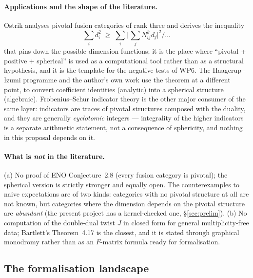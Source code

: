 \documentclass[11pt,a4paper]{article}
\theoremstyle{remark}
\begin{document}
\paragraph{Applications and the shape of the literature.}
Ostrik \cite{Ostrik1309} analyses pivotal fusion categories of rank three and derives the
inequality \[
\sum_i d_i^{2} \;\ge\; \sum_i \bigl|\,\textstyle\sum_j N_{ij}^{k} d_j\bigr|^{2}/\dots
\]
that pins down the possible dimension functions; it is the place where ``pivotal + positive +
spherical'' is used as a computational tool rather than as a structural hypothesis, and it is the
template for the negative tests of WP6. The Haagerup--Izumi programme and the author's own work
\cite{Huang2609} use the theorem at a different point, to convert coefficient identities
(analytic) into a spherical structure (algebraic). Frobenius--Schur indicator theory
\cite{NgSchauenburg} is the other major consumer of the same layer: indicators are traces of
pivotal structures composed with the duality, and they are generally \emph{cyclotomic} integers
--- integrality of the higher indicators is a separate arithmetic statement, not a consequence of
sphericity, and nothing in this proposal depends on it.

\paragraph{What is \emph{not} in the literature.}
(a) No proof of ENO Conjecture~2.8 (every fusion category is pivotal); the spherical version is
strictly stronger and equally open. The counterexamples to naive expectations are of two kinds:
categories with no pivotal structure at all are not known, but categories where the dimension
depends on the pivotal structure are \emph{abundant} (the present project has a kernel-checked
one, \S\ref{sec:prelim}). (b) No computation of the double-dual twist $J$ in closed form for
general multiplicity-free data; Bartlett's Theorem~4.17 is the closest, and it is stated through
graphical monodromy rather than as an $F$-matrix formula ready for formalisation.

\subsection{The formalisation landscape}
\end{document}
